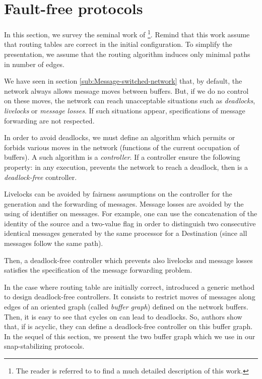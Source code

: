 \documentclass[11pt]{article}
\begin{document}
\section{Fault-free protocols}\label{sec:survey}

In this section, we survey the seminal work of \cite{MS78}\footnote{The reader is referred to \cite{T01} to find a much detailed description of this work.}. Remind that this work assume that routing tables are correct in the initial configuration.  To simplify the presentation, we assume that the routing algorithm induces only minimal paths in number of edges.

We have seen in section \ref{sub:Message-switched-network} that, by default, the network always allows message moves between buffers. But, if we do no control on these moves, the network can reach unacceptable situations such as \emph{deadlocks}, \emph{livelocks} or \emph{message losses}. If such situations appear, specifications of message forwarding are not respected.

In order to avoid deadlocks, we must define an algorithm which permits or forbids various moves in the network (functions of the current occupation of buffers). A such algorithm is a \emph{controller}. If a controller  ensure the following property: in any execution,  prevents the network to reach a deadlock, then  is a \emph{deadlock-free} controller.

Livelocks can be avoided by fairness assumptions on the controller for the generation and the forwarding of messages. Message losses are avoided by the using of identifier on messages. For example, one can use the concatenation of the identity of the source and a two-value flag in order to distinguish two consecutive identical messages generated by the same processor for a Destination  (since all messages follow the same path).

Then, a deadlock-free controller which prevents also livelocks and message losses satisfies the specification of the message forwarding problem.

In the case where routing table are initially correct, \cite{MS78} introduced a generic method to design deadlock-free controllers. It consists to restrict moves of messages along edges of an oriented graph  (called \emph{buffer graph}) defined on the network buffers. Then, it is easy to see that cycles on  can lead to deadlocks. So, authors show that, if  is acyclic, they can define a deadlock-free controller on this buffer graph. In the sequel of this section, we present the two buffer graph which we use in our snap-stabilizing protocols.
\end{document}
